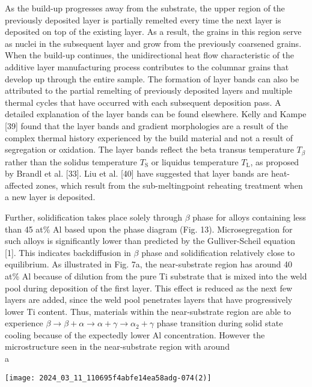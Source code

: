 \documentclass[10pt]{article}
\begin{document}
As the build-up progresses away from the substrate, the upper region of the previously deposited layer is partially remelted every time the next layer is deposited on top of the existing layer. As a result, the grains in this region serve as nuclei in the subsequent layer and grow from the previously coarsened grains. When the build-up continues, the unidirectional heat flow characteristic of the additive layer manufacturing process contributes to the columnar grains that develop up through the entire sample. The formation of layer bands can also be attributed to the partial remelting of previously deposited layers and multiple thermal cycles that have occurred with each subsequent deposition pass. A detailed explanation of the layer bands can be found elsewhere. Kelly and Kampe [39] found that the layer bands and gradient morphologies are a result of the complex thermal history experienced by the build material and not a result of segregation or oxidation. The layer bands reflect the beta transus temperature $T_{\beta}$ rather than the solidus temperature $T_{\mathrm{S}}$ or liquidus temperature $T_{\mathrm{L}}$, as proposed by Brandl et al. [33]. Liu et al. [40] have suggested that layer bands are heat-affected zones, which result from the sub-meltingpoint reheating treatment when a new layer is deposited.

Further, solidification takes place solely through $\beta$ phase for alloys containing less than 45 at\% $\mathrm{Al}$ based upon the phase diagram (Fig. 13). Microsegregation for such alloys is significantly lower than predicted by the Gulliver-Scheil equation [1]. This indicates backdiffusion in $\beta$ phase and solidification relatively close to equilibrium. As illustrated in Fig. 7a, the near-substrate region has around 40 at\% $\mathrm{Al}$ because of dilution from the pure Ti substrate that is mixed into the weld pool during deposition of the first layer. This effect is reduced as the next few layers are added, since the weld pool penetrates layers that have progressively lower Ti content. Thus, materials within the near-substrate region are able to experience $\beta \rightarrow \beta+\alpha \rightarrow \alpha+\gamma \rightarrow \alpha_{2}+\gamma$ phase transition during solid state cooling because of the expectedly lower Al concentration. However the microstructure seen in the near-substrate region with around\\
a

\begin{center}
\texttt{[image: 2024\_03\_11\_110695f4abfe14ea58adg-074(2)]}
\end{center}
\end{document}

